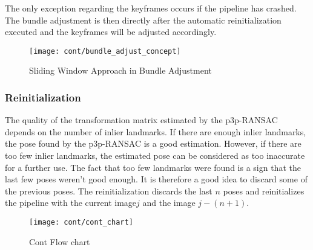 The only exception regarding the keyframes occurs if the pipeline has crashed. The bundle adjustment is then directly after the automatic reinitialization executed and the keyframes will be adjusted accordingly.

\begin{figure}
	\centering
	\texttt{[image: cont/bundle\_adjust\_concept]}
	\caption{Sliding Window Approach in Bundle Adjustment}
	\label{fig:ba_concept}
\end{figure}

\subsubsection{Reinitialization}
The quality of the transformation matrix estimated by the p3p-RANSAC depends on the number of inlier landmarks. If there are enough inlier landmarks, the pose found by the p3p-RANSAC is a good estimation. However, if there are too few inlier landmarks, the estimated pose can be considered as too inaccurate for a further use. The fact that too few landmarks were found is a sign that the last few poses weren't good enough. It is therefore a good idea to discard some of the previous poses. The reinitialization discards the last \begin{math} n \end{math} poses and reinitializes the pipeline with the current image\begin{math} j \end{math} and the image \begin{math} j-(n+1) \end{math}. 

\begin{figure}[ht]
	\centering
	\texttt{[image: cont/cont\_chart]}
	\caption{Cont Flow chart}
	\label{img_flow_cont}
\end{figure}